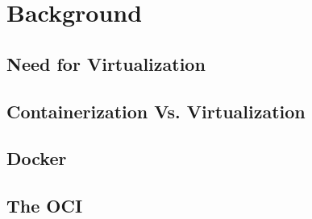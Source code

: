 \section{Background}
\label{sec::bkgd}


\subsection{Need for Virtualization}
\label{ssec::bkgd:need-virt}

\subsection{Containerization Vs. Virtualization}
\label{ssec::bkgd:cont-vs-virt}

\subsection{Docker}
\label{ssec::bkgd:docker}

\subsection{The OCI}
\label{ssec::bkgd:oci}